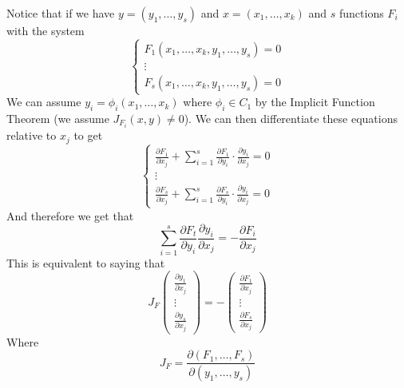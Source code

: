 \documentclass[10pt]{article}
\def\pdv#1#2{\frac{\partial #1}{\partial #2}}
\begin{document}


\bigskip

Notice that if we have $y=(y_1,\dots,y_s)$ and $x=(x_1,\dots,x_k)$ and $s$ functions $F_i$ with the system
\[ \left\{\begin{gathered}F_1(x_1,\dots,x_k,y_1,\dots,y_s) = 0 \\ \vdots \\ F_s(x_1,\dots,x_k,y_1,\dots,y_s) = 0 \end{gathered}\right. \]
We can assume $y_i=\phi_i(x_1,\dots,x_k)$ where $\phi_i\in C_1$ by the Implicit Function Theorem (we assume $J_{F_i}(x,y)\neq0$).
We can then differentiate these equations relative to $x_j$ to get
\[ \left\{\begin{gathered}\pdv{F_1}{x_j} + \sum_{i=1}^s\pdv{F_1}{y_i}\cdot\pdv{y_i}{x_j} = 0 \\ \vdots \\ \pdv{F_s}{x_j} + \sum_{i=1}^s\pdv{F_s}{y_i}\cdot\pdv{y_i}{x_j} = 0 \end{gathered}\right. \]
And therefore we get that
\[ \sum_{i=1}^s\pdv{F_t}{y_i}\pdv{y_i}{x_j} = -\pdv{F_i}{x_j} \]
This is equivalent to saying that
\[ J_F\begin{pmatrix}\pdv{y_1}{x_j}\\\vdots\\\pdv{y_s}{x_j}\end{pmatrix} = -\begin{pmatrix}\pdv{F_1}{x_j}\\\vdots\\\pdv{F_s}{x_j}\end{pmatrix} \]
Where
\[ J_F = \pdv{(F_1,\dots,F_s)}{(y_1,\dots,y_s)} \]
\end{document}
